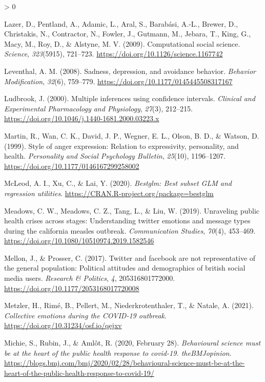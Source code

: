 \documentclass[
  english,
  jou,floatsintext]{apa7}
\newlength{\cslhangindent}
\newenvironment{CSLReferences}[2] %
 {%
  \setlength{\parindent}{0pt}
  \ifodd #1 \everypar{\setlength{\hangindent}{\cslhangindent}}\ignorespaces\fi
  \ifnum #2 > 0
  \setlength{\parskip}{#2\baselineskip}
  \fi
 }%
 {}
\begin{document}
\begin{CSLReferences}{1}{0}
\leavevmode\hypertarget{ref-Lazer2009}{}%
Lazer, D., Pentland, A., Adamic, L., Aral, S., Barabási, A.-L., Brewer, D., Christakis, N., Contractor, N., Fowler, J., Gutmann, M., Jebara, T., King, G., Macy, M., Roy, D., \& Alstyne, M. V. (2009). Computational social science. \emph{Science}, \emph{323}(5915), 721--723. \url{https://doi.org/10.1126/science.1167742}

\leavevmode\hypertarget{ref-Leventhal2008}{}%
Leventhal, A. M. (2008). Sadness, depression, and avoidance behavior. \emph{Behavior Modification}, \emph{32}(6), 759--779. \url{https://doi.org/10.1177/0145445508317167}

\leavevmode\hypertarget{ref-Ludbrook2000}{}%
Ludbrook, J. (2000). Multiple inferences using confidence intervals. \emph{Clinical and Experimental Pharmacology and Physiology}, \emph{27}(3), 212--215. \url{https://doi.org/10.1046/j.1440-1681.2000.03223.x}

\leavevmode\hypertarget{ref-Martin1999}{}%
Martin, R., Wan, C. K., David, J. P., Wegner, E. L., Olson, B. D., \& Watson, D. (1999). Style of anger expression: Relation to expressivity, personality, and health. \emph{Personality and Social Psychology Bulletin}, \emph{25}(10), 1196--1207. \url{https://doi.org/10.1177/0146167299258002}

\leavevmode\hypertarget{ref-R-bestglm}{}%
McLeod, A. I., Xu, C., \& Lai, Y. (2020). \emph{Bestglm: Best subset GLM and regression utilities}. \url{https://CRAN.R-project.org/package=bestglm}

\leavevmode\hypertarget{ref-Meadows2019}{}%
Meadows, C. W., Meadows, C. Z., Tang, L., \& Liu, W. (2019). Unraveling public health crises across stages: Understanding twitter emotions and message types during the california measles outbreak. \emph{Communication Studies}, \emph{70}(4), 453--469. \url{https://doi.org/10.1080/10510974.2019.1582546}

\leavevmode\hypertarget{ref-Mellon2017}{}%
Mellon, J., \& Prosser, C. (2017). Twitter and facebook are not representative of the general population: Political attitudes and demographics of british social media users. \emph{Research \& Politics}, \emph{4}, 205316801772000. \url{https://doi.org/10.1177/2053168017720008}

\leavevmode\hypertarget{ref-Metzler2021}{}%
Metzler, H., Rimé, B., Pellert, M., Niederkrotenthaler, T., \& Natale, A. (2021). \emph{Collective emotions during the COVID-19 outbreak}. \url{https://doi.org/10.31234/osf.io/qejxv}

\leavevmode\hypertarget{ref-michie2020}{}%
Michie, S., Rubin, J., \& Amlôt, R. (2020, February 28). \emph{Behavioural science must be at the heart of the public health response to covid-19. {theBMJopinion}}. \url{https://blogs.bmj.com/bmj/2020/02/28/behavioural-science-must-be-at-the-heart-of-the-public-health-response-to-covid-19/}


\end{CSLReferences}
\end{document}
